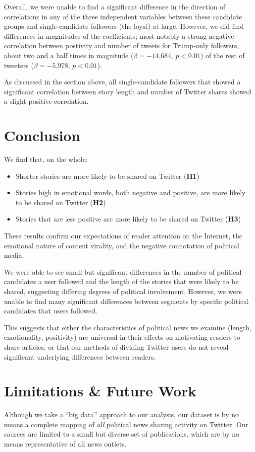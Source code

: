 \documentclass[letterpaper]{article}
\begin{document}
Overall, we were unable to find a significant difference in the direction of correlations in any of the three independent variables between these candidate groups and single-candidate followers (the loyal) at large. However, we did find differences in magnitudes of the coefficients; most notably a strong negative correlation between postivity and number of tweets for Trump-only followers, about two and a half times in magnitude ($\beta=-14.684$, $p<0.01$) of the rest of tweeters ($\beta=−5.978$, $p<0.01$). 

As discussed in the section above, all single-candidate followers that showed a significant correlation between story length and number of Twitter shares showed a slight positive correlation.

\section{Conclusion}

We find that, on the whole:
\begin{itemize}
    \item Shorter stories are more likely to be shared on Twitter (\textbf{H1})
    \item Stories high in emotional words, both negative and positive, are more likely to be shared on Twitter (\textbf{H2})
    \item Stories that are less positive are more likely to be shared on Twitter (\textbf{H3})
\end{itemize}

These results confirm our expectations of reader attention on the Internet, the emotional nature of content virality, and the negative connotation of political media. 

We were able to see small but significant differences in the number of political candidates a user followed and the length of the stories that were likely to be shared, suggesting differing degrees of political involvement. However, we were unable to find many significant differences between segments by specific political candidates that users followed. 

This suggests that either the characteristics of political news we examine (length, emotionality, positivity) are universal in their effects on motivating readers to share articles, or that our methods of dividing Twitter users do not reveal significant underlying differences between readers.


\section{Limitations \& Future Work}
Although we take a ``big data'' approach to our analysis, our dataset is by no means a complete mapping of \emph{all} political news sharing activity on Twitter. Our sources are limited to a small but diverse set of publications, which are by no means representative of all news outlets.
\end{document}
